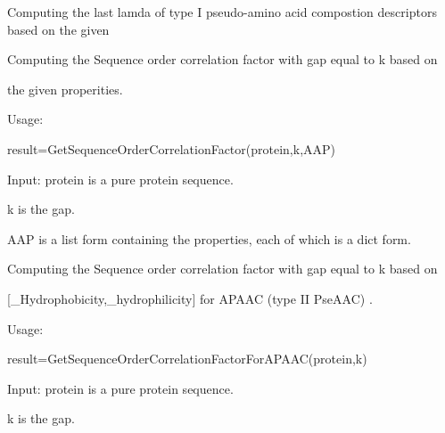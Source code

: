 \documentclass[letterpaper,10pt,english]{sphinxmanual}
\begin{document}

\begin{fulllineitems}
\label{reference/PseudoAAC:PseudoAAC.GetPseudoAAC2}
Computing the last lamda of type I pseudo-amino acid compostion descriptors based on the given

\end{fulllineitems}


\begin{fulllineitems}
\label{reference/PseudoAAC:PseudoAAC.GetSequenceOrderCorrelationFactor}
Computing the Sequence order correlation factor with gap equal to k based on

the given properities.

Usage:

result=GetSequenceOrderCorrelationFactor(protein,k,AAP)

Input: protein is a pure protein sequence.

k is the gap.

AAP is a list form containing the properties, each of which is a dict form.

\end{fulllineitems}


\begin{fulllineitems}
\label{reference/PseudoAAC:PseudoAAC.GetSequenceOrderCorrelationFactorForAPAAC}
Computing the Sequence order correlation factor with gap equal to k based on

{[}\_Hydrophobicity,\_hydrophilicity{]} for APAAC (type II PseAAC) .

Usage:

result=GetSequenceOrderCorrelationFactorForAPAAC(protein,k)

Input: protein is a pure protein sequence.

k is the gap.

\end{fulllineitems}
\end{document}
